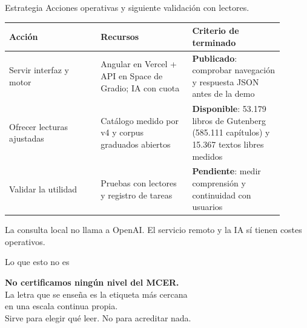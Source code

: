 \documentclass[aspectratio=169,11pt]{beamer}
\begin{document}
\begin{frame}{Estrategia}
\vspace{3mm}
{\small Acciones operativas y siguiente validación con lectores.}
\vspace{3mm}

\begin{center}\small
\begin{tabular}{@{}p{0.30\linewidth} p{0.30\linewidth} p{0.30\linewidth}@{}}
\toprule
\textbf{Acción} & \textbf{Recursos} & \textbf{Criterio de terminado} \\
\midrule
Servir interfaz y motor & Angular en Vercel + API en Space de Gradio;
  IA con cuota &
  \textbf{Publicado}: comprobar navegación y respuesta JSON antes de la demo \\[3mm]
Ofrecer lecturas ajustadas & Catálogo medido por v4 y corpus graduados abiertos &
  \textbf{Disponible}: 53.179 libros de Gutenberg (585.111 capítulos) y 15.367 textos libres medidos \\[3mm]
Validar la utilidad & Pruebas con lectores y registro de tareas &
  \textbf{Pendiente}: medir comprensión y continuidad con usuarios \\
\bottomrule
\end{tabular}
\end{center}

\vspace{3mm}
{\footnotesize\color{llgris} La consulta local no llama a OpenAI. El servicio
remoto y la IA sí tienen costes operativos.}
\end{frame}

\begin{frame}{Lo que esto no es}
\vspace{8mm}
\begin{center}
{\Large\bfseries\color{llrojo} No certificamos ningún nivel del MCER.}\\[6mm]

{\large La letra que se enseña es la etiqueta más cercana\\
en una escala continua propia.}\\[8mm]

{\normalsize\color{llgris} Sirve para elegir qué leer. No para acreditar nada.}
\end{center}
\end{frame}
\end{document}
